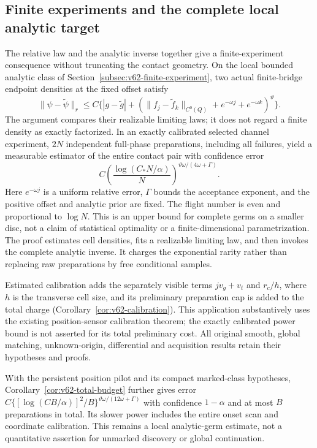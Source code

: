 \subsection{Finite experiments and the complete local analytic target}
The relative law and the analytic inverse together give a finite-experiment
consequence without truncating the contact geometry.  On the local bounded
analytic class of Section~\ref{subsec:v62-finite-experiment}, two actual
finite-bridge endpoint densities at the fixed offset satisfy
\[
 \|\psi-\widetilde\psi\|_r
 \le C\{ |g-\widetilde g|+
       (\|f_j-\widetilde f_k\|_{C^0(Q)}
                         +e^{-\omega j}+e^{-\omega k})^\vartheta\}.
\]
The argument compares their realizable limiting laws; it does not regard a
finite density as exactly factorized.  In an exactly calibrated selected
channel experiment, $2N$ independent full-phase preparations, including all
failures, yield a measurable estimator of the entire contact pair with
confidence error
\[
 C\left(\frac{\log(C_*N/\alpha)}N\right)^{
                         \vartheta\omega/(4\omega+\Gamma)}.
\]
Here $e^{-\omega j}$ is a uniform relative error, $\Gamma$ bounds the
acceptance exponent, and the positive offset and analytic prior are fixed.
The flight number is even and proportional to $\log N$.  This is an upper
bound for complete germs on a smaller disc, not a claim of statistical
optimality or a finite-dimensional parametrization.  The proof estimates
cell densities, fits a realizable limiting law, and then invokes the
complete analytic inverse.  It charges the exponential rarity rather than
replacing raw preparations by free conditional samples.

Estimated calibration adds the separately visible terms $jv_g+v_t$ and
$r_c/h$, where $h$ is the transverse cell size, and its preliminary
preparation cap is added to the total charge
(Corollary~\ref{cor:v62-calibration}).  This application substantively uses
the existing position-sensor calibration theorem; the exactly calibrated
power bound is not asserted for its total preliminary cost.  All original
smooth, global matching, unknown-origin, differential and acquisition
results retain their hypotheses and proofs.

With the persistent position pilot and its compact marked-class hypotheses,
Corollary~\ref{cor:v62-total-budget} further gives error
$C\{[\log(CB/\alpha)]^2/B\}^{\vartheta\omega/(12\omega+\Gamma)}$
with confidence $1-\alpha$ and at most $B$ preparations in total.
Its slower power includes the entire onset scan and coordinate calibration.
This remains a local analytic-germ estimate, not a quantitative assertion
for unmarked discovery or global continuation.
